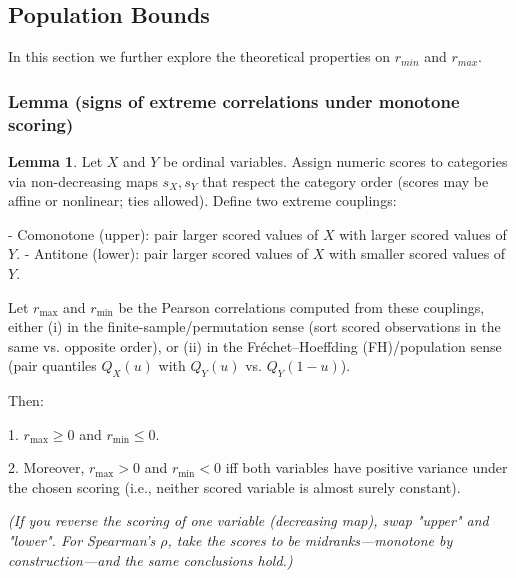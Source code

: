 \documentclass[
  12pt,
]{article}
\theoremstyle{plain}
\theoremstyle{definition}
\newtheorem{lemma}{Lemma}
\theoremstyle{remark}
\begin{document}
\subsection{Population Bounds}\label{population-bounds}

In this section we further explore the theoretical properties on
\(r_{min}\) and \(r_{max}\).

\subsubsection{Lemma (signs of extreme correlations under monotone
scoring)}\label{lemma-signs-of-extreme-correlations-under-monotone-scoring}

\label{prop-max-product}
\begin{lemma}

Let $X$ and $Y$ be ordinal variables. Assign numeric scores to categories via non-decreasing maps $s_X, s_Y$ that respect the category order (scores may be affine or nonlinear; ties allowed). Define two extreme couplings:

- Comonotone (upper): pair larger scored values of $X$ with larger scored values of $Y$.
- Antitone (lower): pair larger scored values of $X$ with smaller scored values of $Y$.
    

Let $r_{\max}$ and $r_{\min}$ be the Pearson correlations computed from these couplings, either (i) in the finite-sample/permutation sense (sort scored observations in the same vs. opposite order), or (ii) in the Fréchet–Hoeffding (FH)/population sense (pair quantiles $Q_X(u)$ with $Q_Y(u)$ vs. $Q_Y(1-u)$).

Then:

1. $r_{\max}\ge 0$ and $r_{\min}\le 0$.
    
2. Moreover, $r_{\max}>0$ and $r_{\min}<0$ iff both variables have positive variance under the chosen scoring (i.e., neither scored variable is almost surely constant).
    

\textit{(If you reverse the scoring of one variable (decreasing map), swap "upper" and "lower". For Spearman's $\rho$, take the scores to be midranks---monotone by construction---and the same conclusions hold.)}
\end{lemma}
\end{document}
